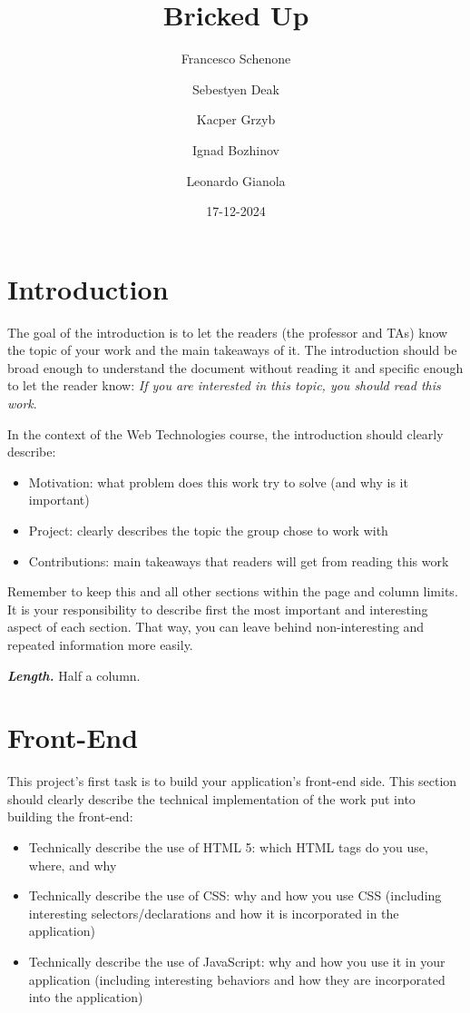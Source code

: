 \documentclass[letterpaper,twocolumn]{article}
\title{Bricked Up}
\author{Francesco Schenone \and Sebestyen Deak \and Kacper Grzyb \and Ignad Bozhinov \and Leonardo Gianola}
\date{17-12-2024}
\newcommand{\myparagraph}[1]{\vspace{0.1cm}\noindent \textbf{\textit{#1.}}}
\begin{document}
\maketitle

\section{Introduction}

The goal of the introduction is to let the readers (the professor and TAs) know the topic of your work and the main takeaways of it.
The introduction should be broad enough to understand the document without reading it and specific enough to let the reader know: \textit{If you are interested in this topic, you should read this work}.

In the context of the Web Technologies course, the introduction should clearly describe:

\begin{itemize}
    \item Motivation: what problem does this work try to solve (and why is it important)
    \item Project: clearly describes the topic the group chose to work with
    \item Contributions: main takeaways that readers will get from reading this work
\end{itemize}


Remember to keep this and all other sections within the page and column limits.
It is your responsibility to describe first the most important and interesting aspect of each section.
That way, you can leave behind non-interesting and repeated information more easily.

\myparagraph{Length} Half a column.

\section{Front-End}

This project's first task is to build your application's front-end side.
This section should clearly describe the technical implementation of the work put into building the front-end:

\begin{itemize}
    \item Technically describe the use of HTML 5: which HTML tags do you use, where, and why
    \item Technically describe the use of CSS: why and how you use CSS (including interesting selectors/declarations and how it is incorporated in the application)
    \item Technically describe the use of JavaScript: why and how you use it in your application (including interesting behaviors and how they are incorporated into the application)
\end{itemize}
\end{document}
